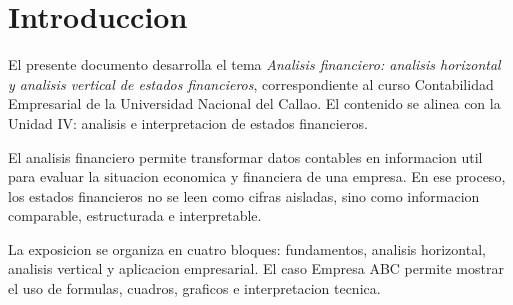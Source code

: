 \section{Introduccion}

El presente documento desarrolla el tema \textit{Analisis financiero: analisis horizontal y analisis vertical de estados financieros}, correspondiente al curso Contabilidad Empresarial de la Universidad Nacional del Callao. El contenido se alinea con la Unidad IV: analisis e interpretacion de estados financieros.

El analisis financiero permite transformar datos contables en informacion util para evaluar la situacion economica y financiera de una empresa. En ese proceso, los estados financieros no se leen como cifras aisladas, sino como informacion comparable, estructurada e interpretable.

La exposicion se organiza en cuatro bloques: fundamentos, analisis horizontal, analisis vertical y aplicacion empresarial. El caso Empresa ABC permite mostrar el uso de formulas, cuadros, graficos e interpretacion tecnica.
